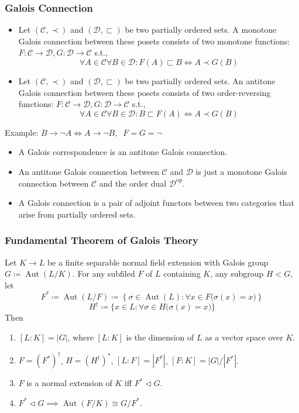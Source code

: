 \documentclass[UTF8,aspectratio=43,11pt,colorlinks,compress,openany]{beamer}%
\begin{document}
\begin{frame}\frametitle{Galois Connection}
\setlength\abovedisplayskip{0pt}
\setlength\belowdisplayskip{0pt}
\begin{definition}
\begin{itemize}
	\item Let $(\mathcal{C},\prec)$ and $(\mathcal{D},\sqsubset)$ be two partially ordered sets. A monotone Galois connection between these posets consists of two monotone functions: $F:\mathcal{C}\to\mathcal{D}, G:\mathcal{D}\to\mathcal{C}$ s.t.,
\[\forall A\in\mathcal{C}\forall B\in\mathcal{D}: F(A)\sqsubset B\iff A\prec G(B)\]
	\item Let $(\mathcal{C},\prec)$ and $(\mathcal{D},\sqsubset)$ be two partially ordered sets. An antitone Galois connection between these posets consists of two order-reversing functions: $F:\mathcal{C}\to\mathcal{D}, G:\mathcal{D}\to\mathcal{C}$ s.t.,
\[\forall A\in\mathcal{C}\forall B\in\mathcal{D}: B\sqsubset F(A)\iff A\prec G(B)\]
\end{itemize}
\end{definition}
Example: $B\to\neg A\iff A\to\neg B,\;\;F=G=\neg$
\begin{itemize}
	\item A Galois correspondence is an antitone Galois connection.
	\item An antitone Galois connection between $\mathcal{C}$ and $\mathcal{D}$ is just a monotone Galois connection between $\mathcal{C}$ and the order dual $\mathcal{D}^{\mathrm{op}}$.
	\item A Galois connection is a pair of adjoint functors between two categories that arise from partially ordered sets.
\end{itemize}
\end{frame}

\begin{frame}\frametitle{Fundamental Theorem of Galois Theory}
\begin{theorem}
Let $K\to L$ be a finite separable normal field extension with Galois group $G\coloneqq \operatorname{Aut}(L/K)$. For any subfiled $F$ of $L$ containing $K$, any subgroup $H<G$, let
\[F^*\coloneqq \operatorname{Aut}(L/F)\coloneqq \left\{\sigma\in\operatorname{Aut}(L):\forall x\in F\big(\sigma(x)=x\big)\right\}\]
\[H^\dagger\coloneqq \big\{x\in L:\forall\sigma\in H\big(\sigma(x)=x\big)\big\}\]
Then
\begin{enumerate}
	\item $[L:K]=|G|$, where $[L:K]$ is the dimension of $L$ as a vector space over $K$.
	\item $F=(F^*)^\dagger$, $H=(H^\dagger)^*$, $[L:F]=|F^*|$, $[F:K]=|G|/|F^*|$.
	\item $F$ is a normal extension of $K$ iff $F^*\lhd G$.
	\item $F^*\lhd G\implies \operatorname{Aut}(F/K)\cong G/F^*$.
\end{enumerate}
\end{theorem}
\end{frame}
\end{document}
